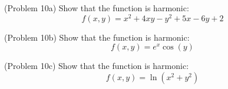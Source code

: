 \documentclass[handout]{ximera}
\begin{document}
\begin{problem}(Problem 10a)
Show that the function is harmonic:
\[
f(x,y) = x^2 + 4xy - y^2 + 5x - 6y +2
\]

\end{problem}

\begin{problem}(Problem 10b)
Show that the function is harmonic:
\[
f(x,y) = e^x \cos(y)
\]

\end{problem}

\begin{problem}(Problem 10c)
Show that the function is harmonic:
\[
f(x,y) = \ln(x^2 + y^2)
\]

\end{problem}
\end{document}
